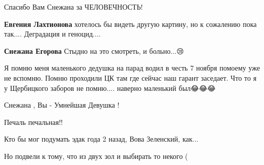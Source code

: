 \begin{itemize}
Спасибо Вам Снежана за ЧЕЛОВЕЧНОСТЬ!

\begin{itemize}
 
\textbf{Евгения Лахтионова} хотелось бы видеть другую картину, но к сожалению пока так....
Деградация и геноцид....

 
\textbf{Снежана Егорова} Стыдно на это смотреть, и больно...😢
\end{itemize}

 

Я помню меня маленького дедушка на парад водил в честь 7 ноября помоему уже не
вспомню. Помню проходили ЦК там где сейчас наш гарант заседает. Что то я у
Щербицкого заборов не помню.... наверно маленький был😂😂😂


 
Снежана , Вы - Умнейшая Девушка !

 

Печаль печальная!!

Кто бы мог подумать эдак года 2 назад, Вова Зеленский, как...

Но подвели к тому, что из двух зол и выбирать то некого (

\begin{itemize}
 

\end{itemize}
\end{itemize}
